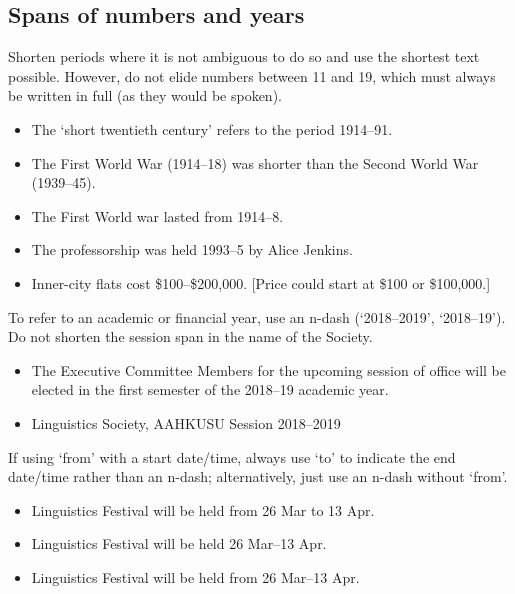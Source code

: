 \documentclass[11pt,a4paper]{book}
\newcommand{\xmark}{{\color{cadmiumred}\ding{54}}}%
\newcommand{\cmark}{{\color{green(html/cssgreen)}\checkmark}}%
\begin{document}
			\subsection{Spans of numbers and years}
			Shorten periods where it is not ambiguous to do so and use the shortest text possible. However, do not elide numbers between 11 and 19, which must always be written in full (as they would be spoken).
			{\firasans \begin{mdframed}[backgroundcolor=aliceblue] \begin{itemize}[label=\cmark]
				\item The `short twentieth century' refers to the period 1914--91.
				\item The First World War (1914--18) was shorter than the Second World War (1939--45).
				\item[\xmark] The First World war lasted from 1914--8.
				\item The professorship was held 1993--5 by Alice Jenkins.
				\item[\xmark] Inner-city flats cost \$100--\$200,000.  [Price could start at \$100 or \$100,000.]
			\end{itemize} \end{mdframed} }
			To refer to an academic or financial year, use an n-dash (`2018--2019', `2018--19'). Do not shorten the session span in the name of the Society.
			{\firasans \begin{mdframed}[backgroundcolor=aliceblue] \begin{itemize}[label=\cmark]
				\item The Executive Committee Members for the upcoming session of office will be elected in the first semester of the 2018--19 academic year.
				\item Linguistics Society, AAHKUSU Session 2018--2019
			\end{itemize} \end{mdframed} }
			If using `from' with a start date/time, always use `to' to indicate the end date/time rather than an n-dash; alternatively, just use an n-dash without `from'.
			{\firasans \begin{mdframed}[backgroundcolor=aliceblue] \begin{itemize}[label=\cmark]
				\item Linguistics Festival will be held from 26 Mar to 13 Apr.
				\item Linguistics Festival will be held 26 Mar--13 Apr.
				\item[\xmark] Linguistics Festival will be held from 26 Mar--13 Apr.
			\end{itemize} \end{mdframed} }
\end{document}
